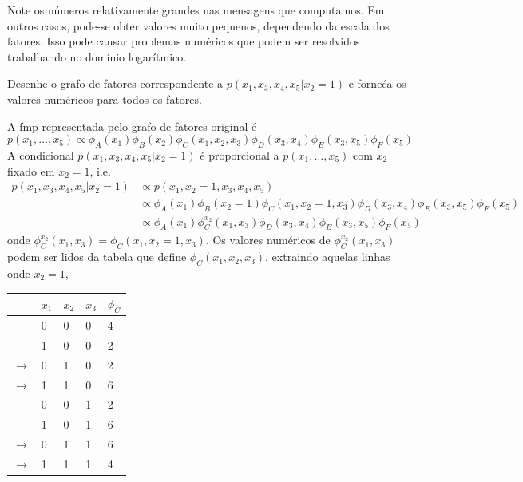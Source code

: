 \begin{exenumerate}
\begin{solution}
        Note os n\'umeros relativamente grandes nas mensagens que
        computamos. Em outros casos, pode-se obter valores muito pequenos,
        dependendo da escala dos fatores. Isso pode causar problemas
        num\'ericos que podem ser resolvidos trabalhando no dom\'inio
        logar\'itmico.
    \end{solution}
    
    \item Desenhe o grafo de fatores correspondente a $p(x_1, x_3, x_4, x_5 | x_2 =1)$ e forne\'ca os valores num\'ericos para todos os fatores.
    
    \begin{solution}
        A fmp representada pelo grafo de fatores original \'e
        $$p(x_1, \ldots, x_5) \propto \phi_A(x_1) \phi_B(x_2) \phi_C(x_1,x_2,x_3) \phi_D(x_3,x_4) \phi_E(x_3,x_5) \phi_F(x_5)$$
        A condicional $p(x_1, x_3, x_4, x_5 | x_2 =1)$ \'e proporcional a $p(x_1, \ldots, x_5)$ com $x_2$ fixado em $x_2=1$, i.e.\
        \begin{align}
            p(x_1, x_3, x_4, x_5 | x_2 =1) &\propto p(x_1,x_2=1, x_3, x_4, x_5) \\
            & \propto \phi_A(x_1) \phi_B(x_2=1) \phi_C(x_1,x_2=1,x_3) \phi_D(x_3,x_4) \phi_E(x_3,x_5) \phi_F(x_5)\\
            & \propto \phi_A(x_1) \phi^{x_2}_C(x_1,x_3) \phi_D(x_3,x_4) \phi_E(x_3,x_5) \phi_F(x_5)
        \end{align}
        onde $\phi^{x_2}_C(x_1,x_3) = \phi_C(x_1,x_2=1,x_3)$. Os valores num\'ericos de $\phi^{x_2}_C(x_1,x_3)$ podem ser lidos da tabela que define $\phi_C(x_1,x_2,x_3)$, extraindo aquelas linhas onde $x_2=1$,
        \begin{center}
            \begin{tabular}{lllll}
                \toprule
                & $x_1$ & $x_2$ & $x_3$ & $\phi_C$\\
                \midrule
                &0 & 0 & 0 & 4 \\
                &1 & 0 & 0 & 2 \\
                $\rightarrow$&0 & 1 & 0 & 2 \\
                $\rightarrow$& 1 & 1 & 0 & 6 \\
                &0 & 0 & 1 & 2 \\
                &1 & 0 & 1 & 6 \\
                $\rightarrow$&0 & 1 & 1 & 6 \\
                $\rightarrow$&1 & 1 & 1 & 4 \\

\end{tabular}
\end{center}
\end{solution}
\end{exenumerate}
